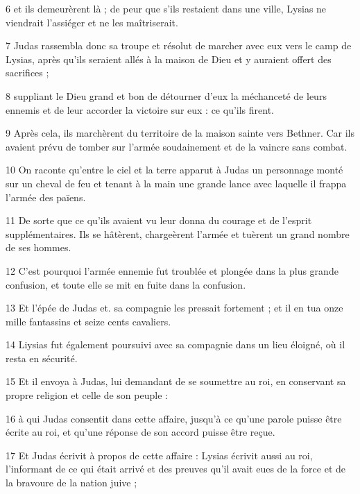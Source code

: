 \par 6 et ils demeurèrent là ; de peur que s'ils restaient dans une ville, Lysias ne viendrait l'assiéger et ne les maîtriserait.

\par 7 Judas rassembla donc sa troupe et résolut de marcher avec eux vers le camp de Lysias, après qu'ils seraient allés à la maison de Dieu et y auraient offert des sacrifices ;

\par 8 suppliant le Dieu grand et bon de détourner d'eux la méchanceté de leurs ennemis et de leur accorder la victoire sur eux : ce qu'ils firent.

\par 9 Après cela, ils marchèrent du territoire de la maison sainte vers Bethner. Car ils avaient prévu de tomber sur l’armée soudainement et de la vaincre sans combat.

\par 10 On raconte qu'entre le ciel et la terre apparut à Judas un personnage monté sur un cheval de feu et tenant à la main une grande lance avec laquelle il frappa l'armée des païens.

\par 11 De sorte que ce qu'ils avaient vu leur donna du courage et de l'esprit supplémentaires. Ils se hâtèrent, chargeèrent l'armée et tuèrent un grand nombre de ses hommes.

\par 12 C'est pourquoi l'armée ennemie fut troublée et plongée dans la plus grande confusion, et toute elle se mit en fuite dans la confusion.

\par 13 Et l'épée de Judas et. sa compagnie les pressait fortement ; et il en tua onze mille fantassins et seize cents cavaliers.

\par 14 Liysias fut également poursuivi avec sa compagnie dans un lieu éloigné, où il resta en sécurité.

\par 15 Et il envoya à Judas, lui demandant de se soumettre au roi, en conservant sa propre religion et celle de son peuple :

\par 16 à qui Judas consentit dans cette affaire, jusqu'à ce qu'une parole puisse être écrite au roi, et qu'une réponse de son accord puisse être reçue.

\par 17 Et Judas écrivit à propos de cette affaire : Lysias écrivit aussi au roi, l'informant de ce qui était arrivé et des preuves qu'il avait eues de la force et de la bravoure de la nation juive ;

